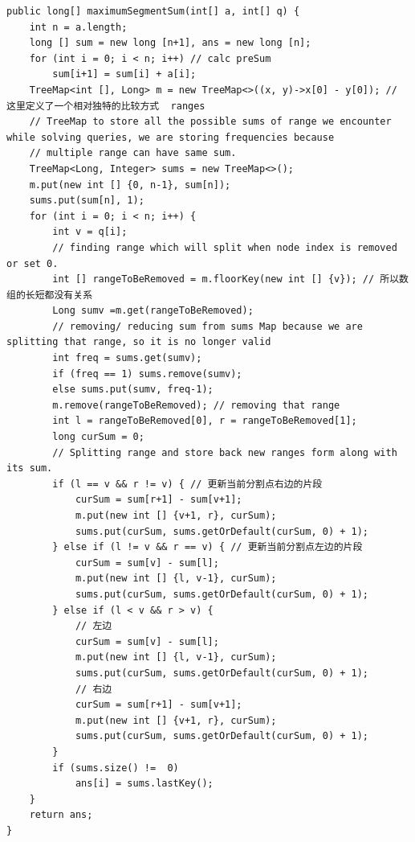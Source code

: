 \documentclass[9pt, b5paaper]{book}
\begin{document}
\begin{verbatim}
public long[] maximumSegmentSum(int[] a, int[] q) {
    int n = a.length;
    long [] sum = new long [n+1], ans = new long [n];
    for (int i = 0; i < n; i++) // calc preSum
        sum[i+1] = sum[i] + a[i];
    TreeMap<int [], Long> m = new TreeMap<>((x, y)->x[0] - y[0]); // 这里定义了一个相对独特的比较方式  ranges
    // TreeMap to store all the possible sums of range we encounter while solving queries, we are storing frequencies because 
    // multiple range can have same sum.            
    TreeMap<Long, Integer> sums = new TreeMap<>(); 
    m.put(new int [] {0, n-1}, sum[n]);
    sums.put(sum[n], 1);
    for (int i = 0; i < n; i++) {
        int v = q[i];
        // finding range which will split when node index is removed or set 0.                
        int [] rangeToBeRemoved = m.floorKey(new int [] {v}); // 所以数组的长短都没有关系
        Long sumv =m.get(rangeToBeRemoved);
        // removing/ reducing sum from sums Map because we are splitting that range, so it is no longer valid
        int freq = sums.get(sumv);
        if (freq == 1) sums.remove(sumv);
        else sums.put(sumv, freq-1);
        m.remove(rangeToBeRemoved); // removing that range
        int l = rangeToBeRemoved[0], r = rangeToBeRemoved[1];
        long curSum = 0;
        // Splitting range and store back new ranges form along with its sum.
        if (l == v && r != v) { // 更新当前分割点右边的片段
            curSum = sum[r+1] - sum[v+1];
            m.put(new int [] {v+1, r}, curSum);
            sums.put(curSum, sums.getOrDefault(curSum, 0) + 1);
        } else if (l != v && r == v) { // 更新当前分割点左边的片段
            curSum = sum[v] - sum[l];
            m.put(new int [] {l, v-1}, curSum);
            sums.put(curSum, sums.getOrDefault(curSum, 0) + 1);
        } else if (l < v && r > v) {
            // 左边
            curSum = sum[v] - sum[l];
            m.put(new int [] {l, v-1}, curSum);
            sums.put(curSum, sums.getOrDefault(curSum, 0) + 1);
            // 右边
            curSum = sum[r+1] - sum[v+1];
            m.put(new int [] {v+1, r}, curSum);
            sums.put(curSum, sums.getOrDefault(curSum, 0) + 1);
        }
        if (sums.size() !=  0)
            ans[i] = sums.lastKey();
    }
    return ans;
}
\end{verbatim}
\end{document}

